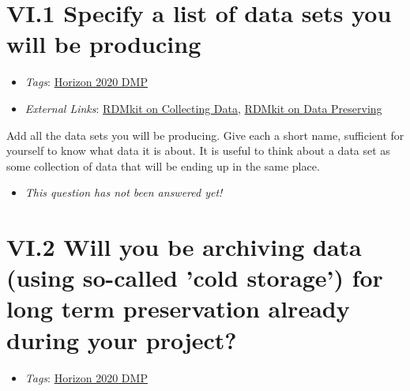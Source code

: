 \documentclass[a4paper,12pt]{report}
\begin{document}
\section*{\protect\textcolor{colorSecId}{VI.1} Specify a list of data sets you will be producing}

\label{d5b27482-b598-4b8c-b534-417d4ad27394.4e0c1edf-660c-4ebf-81f5-9fa959dead30}


\begin{itemize}
  \item \textit{Tags}: \ul{Horizon 2020 DMP}
  
  \item \textit{External Links}: \href{https://rdmkit.elixir-europe.org/collecting}{RDMkit on Collecting Data}, \href{https://rdmkit.elixir-europe.org/preserving}{RDMkit on Data Preserving}\end{itemize}


\noindent
\begin{markdown}
Add all the data sets you will be producing. Give each a short name, sufficient for yourself to know what data it is about. It is useful to think about a data set as some collection of data that will be ending up in the same place.
\end{markdown}



\begin{itemize}
  \item[\XSolidBrush] \textit{This question has not been answered yet!}
\end{itemize}
  


\section*{\protect\textcolor{colorSecId}{VI.2} Will you be archiving data (using so-called 'cold storage') for long term preservation already during your project?}

\label{d5b27482-b598-4b8c-b534-417d4ad27394.d5784d24-0e66-4821-bd62-a711fb6d7a40}


\begin{itemize}
  \item \textit{Tags}: \ul{Horizon 2020 DMP}
  \end{itemize}
\end{document}
